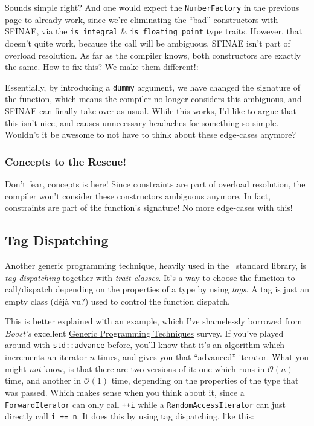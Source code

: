     Sounds simple right? And one would expect the \texttt{NumberFactory} in the previous page to already work, since we're eliminating the ``bad'' constructors with SFINAE, via the \texttt{is\_integral} \& \texttt{is\_floating\_point} type traits. However, that doesn't quite work, because the call will be ambiguous. SFINAE isn't part of overload resolution. As far as the compiler knows, both constructors are exactly the same. How to fix this? We make them different!:

    

    \noindent Essentially, by introducing a \texttt{dummy} argument, we have changed the signature of the function, which means the compiler no longer considers this ambiguous, and SFINAE can finally take over as usual. While this works, I'd like to argue that this isn't nice, and causes unnecessary headaches for something so simple. Wouldn't it be awesome to not have to think about these edge-cases anymore?

    \subsubsection*{Concepts to the Rescue!}

    Don't fear, concepts is here! Since constraints are part of overload resolution, the compiler won't consider these constructors ambiguous anymore. In fact, constraints are part of the function's signature! No more edge-cases with this!

    

\subsection{Tag Dispatching} \label{sec:tag_dispatching}

    Another generic programming technique, heavily used in the \Cpp\ standard library, is \emph{tag dispatching} together with \emph{trait classes}. It's a way to choose the function to call/dispatch depending on the properties of a type by using \emph{tags}. A tag is just an empty class (déjà vu?) used to control the function dispatch.

    This is better explained with an example, which I've shamelessly borrowed from \emph{Boost's} excellent \href{https://www.boost.org/community/generic_programming.html#tag_dispatching}{Generic Programming Techniques} survey. If you've played around with \texttt{std::advance} before, you'll know that it's an algorithm which increments an iterator $n$ times, and gives you that ``advanced'' iterator. What you might \emph{not} know, is that there are two versions of it: one which runs in $\mathcal{O}(n)$ time, and another in $\mathcal{O}(1)$ time, depending on the properties of the type that was passed. Which makes sense when you think about it, since a \texttt{ForwardIterator} can only call \texttt{++i} while a \texttt{RandomAccessIterator} can just directly call \texttt{i += n}. It does this by using tag dispatching, like this:

